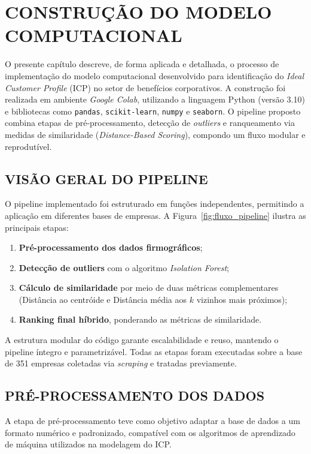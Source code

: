 \chapter{CONSTRUÇÃO DO MODELO COMPUTACIONAL}

O presente capítulo descreve, de forma aplicada e detalhada, o processo de implementação do modelo computacional desenvolvido para identificação do \textit{Ideal Customer Profile} (ICP) no setor de benefícios corporativos. A construção foi realizada em ambiente \textit{Google Colab}, utilizando a linguagem Python (versão 3.10) e bibliotecas como \texttt{pandas}, \texttt{scikit-learn}, \texttt{numpy} e \texttt{seaborn}. O pipeline proposto combina etapas de pré-processamento, detecção de \textit{outliers} e ranqueamento via medidas de similaridade (\textit{Distance-Based Scoring}), compondo um fluxo modular e reprodutível.

\section{VISÃO GERAL DO PIPELINE}

O pipeline implementado foi estruturado em funções independentes, permitindo a aplicação em diferentes bases de empresas. A Figura~\ref{fig:fluxo_pipeline} ilustra as principais etapas:
\begin{enumerate}
    \item \textbf{Pré-processamento dos dados firmográficos};
    \item \textbf{Detecção de outliers} com o algoritmo \textit{Isolation Forest};
    \item \textbf{Cálculo de similaridade} por meio de duas métricas complementares (Distância ao centróide e Distância média aos $k$ vizinhos mais próximos);
    \item \textbf{Ranking final híbrido}, ponderando as métricas de similaridade.
\end{enumerate}

A estrutura modular do código garante escalabilidade e reuso, mantendo o pipeline íntegro e parametrizável. Todas as etapas foram executadas sobre a base de 351 empresas coletadas via \textit{scraping} e tratadas previamente.

\section{PRÉ-PROCESSAMENTO DOS DADOS}

A etapa de pré-processamento teve como objetivo adaptar a base de dados a um formato numérico e padronizado, compatível com os algoritmos de aprendizado de máquina utilizados na modelagem do ICP.

